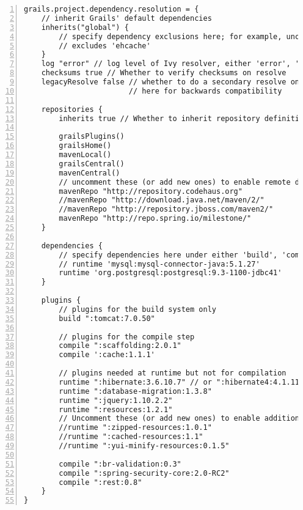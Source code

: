 \begin{lstlisting}[numbers=left,  caption={\bf  BuildConfig.groovy}, frame=trBL,
    float=htbp, label=codBuildConfig3] 
grails.project.dependency.resolution = {
    // inherit Grails' default dependencies
    inherits("global") {
        // specify dependency exclusions here; for example, uncomment this to disable ehcache:
        // excludes 'ehcache'
    }
    log "error" // log level of Ivy resolver, either 'error', 'warn', 'info', 'debug' or 'verbose'
    checksums true // Whether to verify checksums on resolve
    legacyResolve false // whether to do a secondary resolve on plugin installation, not advised and 
                        // here for backwards compatibility

    repositories {
        inherits true // Whether to inherit repository definitions from plugins

        grailsPlugins()
        grailsHome()
        mavenLocal()
        grailsCentral()
        mavenCentral()
        // uncomment these (or add new ones) to enable remote dependency resolution from public Maven repositories
        mavenRepo "http://repository.codehaus.org"
        //mavenRepo "http://download.java.net/maven/2/"
        //mavenRepo "http://repository.jboss.com/maven2/"
        mavenRepo "http://repo.spring.io/milestone/"
    }

    dependencies {
        // specify dependencies here under either 'build', 'compile', 'runtime', 'test' or 'provided' scopes e.g.
        // runtime 'mysql:mysql-connector-java:5.1.27'
        runtime 'org.postgresql:postgresql:9.3-1100-jdbc41'
    }

    plugins {
        // plugins for the build system only
        build ":tomcat:7.0.50"

        // plugins for the compile step
        compile ":scaffolding:2.0.1"
        compile ':cache:1.1.1'

        // plugins needed at runtime but not for compilation
        runtime ":hibernate:3.6.10.7" // or ":hibernate4:4.1.11.6"
        runtime ":database-migration:1.3.8"
        runtime ":jquery:1.10.2.2"
        runtime ":resources:1.2.1"
        // Uncomment these (or add new ones) to enable additional resources capabilities
        //runtime ":zipped-resources:1.0.1"
        //runtime ":cached-resources:1.1"
        //runtime ":yui-minify-resources:0.1.5"
        
        compile ":br-validation:0.3"
        compile ":spring-security-core:2.0-RC2"
        compile ":rest:0.8"
    }
}
\end{lstlisting}

